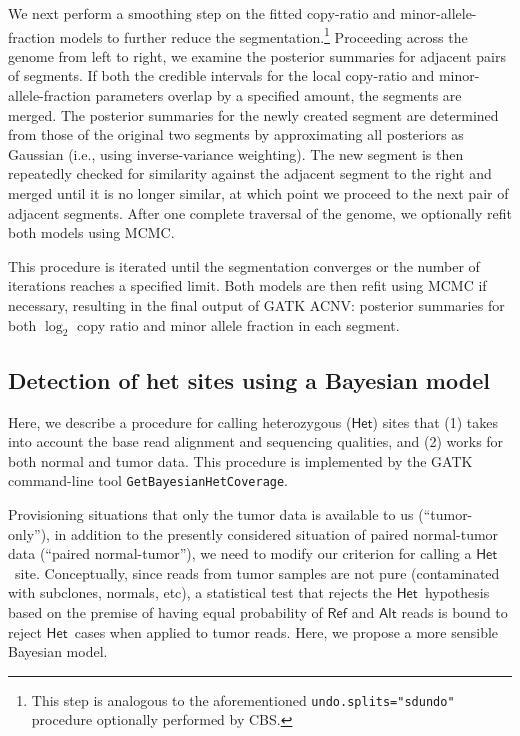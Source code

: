 \documentclass[nofootinbib,amssymb,amsmath]{revtex4}
\newcommand{\HET}{$\mathsf{Het}$}
\begin{document}
We next perform a smoothing step on the fitted copy-ratio and minor-allele-fraction models to further reduce the segmentation.\footnote{This step is analogous to the aforementioned \texttt{undo.splits="sdundo"} procedure optionally performed by CBS.}  Proceeding across the genome from left to right, we examine the posterior summaries for adjacent pairs of segments.  If both the credible intervals for the local copy-ratio and minor-allele-fraction parameters overlap by a specified amount, the segments are merged.  The posterior summaries for the newly created segment are determined from those of the original two segments by approximating all posteriors as Gaussian (i.e., using inverse-variance weighting).  The new segment is then repeatedly checked for similarity against the adjacent segment to the right and merged until it is no longer similar, at which point we proceed to the next pair of adjacent segments.  After one complete traversal of the genome, we optionally refit both models using MCMC.

This procedure is iterated until the segmentation converges or the number of iterations reaches a specified limit.  Both models are then refit using MCMC if necessary, resulting in the final output of GATK ACNV: posterior summaries for both $\log_2$ copy ratio and minor allele fraction in each segment.

\subsection{Detection of het sites using a Bayesian model} \label{bayesian-het-coverage}

Here, we describe a procedure for calling heterozygous (\HET) sites that (1) takes into account the base read alignment and sequencing qualities, and (2) works for both normal and tumor data.  This procedure is implemented by the GATK command-line tool \texttt{GetBayesianHetCoverage}.

Provisioning situations that only the tumor data is available to us (``tumor-only''), in addition to the presently considered situation of paired normal-tumor data (``paired normal-tumor''), we need to modify our criterion for calling a \HET~site. Conceptually, since reads from tumor samples are not pure (contaminated with subclones, normals, etc), a statistical test that rejects the \HET~hypothesis based on the premise of having equal probability of $\mathsf{Ref}$ and $\mathsf{Alt}$ reads is bound to reject \HET~cases when applied to tumor reads. Here, we propose a more sensible Bayesian model.\\
\end{document}
